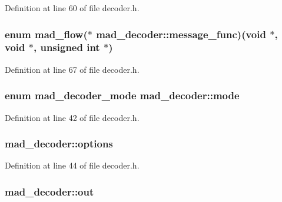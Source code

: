 Definition at line 60 of file decoder.\+h.

\subsubsection[{\texorpdfstring{message\+\_\+func}{message_func}}]{\setlength{\rightskip}{0pt plus 5cm}enum {\bf mad\+\_\+flow}($\ast$ mad\+\_\+decoder\+::message\+\_\+func)({\bf void} $\ast$, {\bf void} $\ast$, unsigned {\bf int} $\ast$)}\hypertarget{structmad__decoder_a44577c1d539888c49dcc2f06dc136076}{}\label{structmad__decoder_a44577c1d539888c49dcc2f06dc136076}


Definition at line 67 of file decoder.\+h.

\subsubsection[{\texorpdfstring{mode}{mode}}]{\setlength{\rightskip}{0pt plus 5cm}enum {\bf mad\+\_\+decoder\+\_\+mode} mad\+\_\+decoder\+::mode}\hypertarget{structmad__decoder_a4b099e23e17617d7b71d08d10eed7d08}{}\label{structmad__decoder_a4b099e23e17617d7b71d08d10eed7d08}


Definition at line 42 of file decoder.\+h.

\subsubsection[{\texorpdfstring{options}{options}}]{ mad\+\_\+decoder\+::options}\hypertarget{structmad__decoder_ae9aa89b5fdbe3927bc168f4334f88196}{}\label{structmad__decoder_ae9aa89b5fdbe3927bc168f4334f88196}


Definition at line 44 of file decoder.\+h.

\subsubsection[{\texorpdfstring{out}{out}}]{ mad\+\_\+decoder\+::out}\hypertarget{structmad__decoder_af4e6ba82d0062976edd0b0ca886c1c1e}{}\label{structmad__decoder_af4e6ba82d0062976edd0b0ca886c1c1e}


